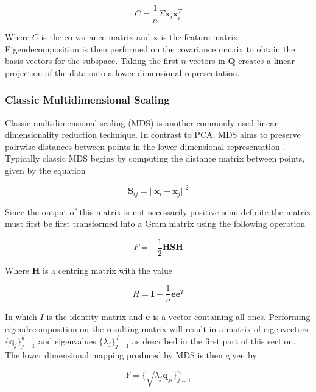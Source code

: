 \begin{equation}
	C = \frac{1}{n}\Sigma \mathbf{x}_i \mathbf{x}_i^T
\end{equation}

Where $C$ is the co-variance matrix and $\mathbf{x}$ is the feature matrix. Eigendecomposition is then performed on the covariance matrix to obtain the basis vectors for the subspace. Taking the first $n$ vectors in $\bm{Q}$ creates a linear projection of the data onto a lower dimensional representation.

\subsubsection{Classic Multidimensional Scaling}
Classic multidimensional scaling (MDS) is another commonly used linear dimensionality reduction technique. In contrast to PCA, MDS aims to preserve pairwise distances between points in the lower dimensional representation \cite{strange2014open}. Typically classic MDS begins by computing the distance matrix between points, given by the equation

\begin{equation}
	\bm{S}_{ij} = || \bm{x}_i - \bm{x}_j ||^2
\end{equation}

Since the output of this matrix is not necessarily positive semi-definite the matrix must first be first transformed into a Gram matrix using the following operation \cite{strange2014open}

\begin{equation}
	F = - \frac{1}{2}\bm{HSH}
\end{equation}

Where $\bm{H}$ is a centring matrix with the value

\begin{equation}
	H = \bm{I} - \frac{1}{n}\bm{ee}^T
\end{equation}

In which $I$ is the identity matrix and $\bm{e}$ is a vector containing all ones. Performing eigendecomposition on the resulting matrix will result in a matrix of eigenvectors $\{\bm{q}_j\}_{j=1}^d$ and eigenvalues $\{\lambda_j\}_{j=1}^d$ as described in the first part of this section. The lower dimensional mapping produced by MDS is then given by

\begin{equation}
	Y = \{\sqrt{\lambda_j}\bm{q}_{ji}\}_{j=1}^n
\end{equation}

